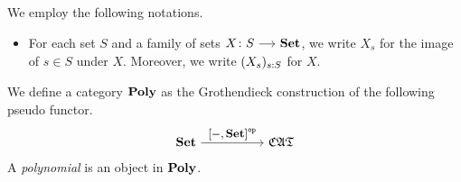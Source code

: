 \documentclass[a4paper,dvipsnames, 11pt]{amsart}
\begin{document}
\maketitle
\begin{notation}
	We employ the following notations.
	\begin{itemize}
		\item %
			For each set $S$ and a family of sets $X\colon S\arr\Set$,
			we write $X_s$ for the image of $s\in S$ under $X$.
			Moreover, we write $(X_s)_{s: S}$ for $X$.
	\end{itemize}
\end{notation}
\begin{definition}
	We define a category $\mathbf{Poly}$ as the Grothendieck construction of the following pseudo functor.
	\[
		\Set
		\arr"\left[-,\Set\right]^\op"[][5]
		\CATbi
	\]
	A \emph{polynomial} is an object in $\mathbf{Poly}$.
\end{definition}



\end{document}
